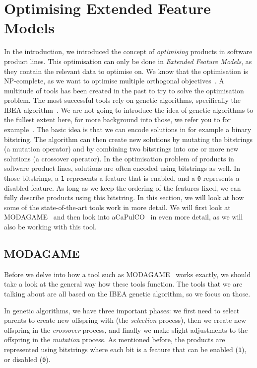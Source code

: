 \section{Optimising Extended Feature Models}\label{sec:tools}
In the introduction, we introduced the concept of \emph{optimising}
products in software product lines. This optimisation can only be done
in \emph{Extended Feature Models}, as they contain the relevant data
to optimise on. We know that the optimisation is NP-complete, as we want
to optimise multiple orthogonal objectives~\cite{ochoa2018npcomplete}.
A multitude of tools has been created in the past to try to solve the
optimisation problem. The most successful tools rely on genetic algorithms,
specifically the IBEA algorithm~\cite{zitzler2004ibea}. We are not going
to introduce the idea of genetic algorithms to the fullest extent here,
for more background into those, we refer you to for
example~\cite{kramer2017geneticalgos}. The basic idea is that we can
encode solutions in for example a binary bitstring. The algorithm can then
create new solutions by mutating the bitstrings (a mutation operator) and
by combining two bitstrings into one or more new solutions (a crossover 
operator). In the optimisation problem of products in software product lines,
solutions are often encoded using bitstrings as well. In those bitstrings,
a \texttt{1} represents a feature that is enabled, and a \texttt{0} 
represents a disabled feature. As long as we keep the ordering of the
features fixed, we can fully describe products using this bitstring.
In this section, we will look at how some of the state-of-the-art tools work
in more detail. We will first look at MODAGAME~\cite{pascual2015modagame}
and then look into aCaPulCO~\cite{horcas2022breakit} in even more detail, as 
we will also be working with this tool.

\subsection{MODAGAME}\label{sec:modagame}
Before we delve into how a tool such as MODAGAME~\cite{pascual2015modagame}
works exactly, we should take a look at the general way how these tools
function. The tools that we are talking about are all based on the IBEA
genetic algorithm, so we focus on those.

In genetic algorithms, we have three important phases: we first need to
select parents to create new offspring with (the \emph{selection} process),
then we create new offspring in the \emph{crossover} process, and finally
we make slight adjustments to the offspring in the \emph{mutation} process.
As mentioned before, the products are represented using bitstrings where
each bit is a feature that can be enabled (\texttt{1}), or disabled 
(\texttt{0}).

